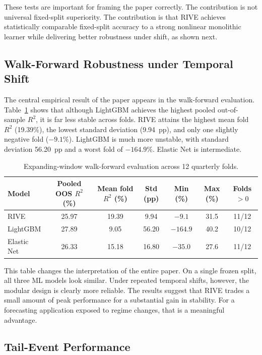 \documentclass[review]{elsarticle}
\begin{document}
These tests are important for framing the paper correctly. The contribution is not universal fixed-split superiority. The contribution is that RIVE achieves statistically comparable fixed-split accuracy to a strong nonlinear monolithic learner while delivering better robustness under shift, as shown next.

\subsection{Walk-Forward Robustness under Temporal Shift}\label{sec:walk-forward}

The central empirical result of the paper appears in the walk-forward evaluation. Table~\ref{tab:walkforward} shows that although LightGBM achieves the highest pooled out-of-sample $R^2$, it is far less stable across folds. RIVE attains the highest mean fold $R^2$ (19.39\%), the lowest standard deviation (9.94~pp), and only one slightly negative fold ($-9.1\%$). LightGBM is much more unstable, with standard deviation 56.20~pp and a worst fold of $-164.9\%$. Elastic Net is intermediate.

\begin{table}[H]
\centering
\caption{Expanding-window walk-forward evaluation across 12 quarterly folds.}
\label{tab:walkforward}
\small
\begin{tabular}{lcccccc}
\toprule
Model & Pooled OOS $R^2$ (\%) & Mean fold $R^2$ (\%) & Std (pp) & Min (\%) & Max (\%) & Folds $>0$ \\
\midrule
RIVE & 25.97 & 19.39 & 9.94 & $-9.1$ & 31.5 & 11/12 \\
LightGBM & 27.89 & 9.05 & 56.20 & $-164.9$ & 40.2 & 10/12 \\
Elastic Net & 26.33 & 15.18 & 16.80 & $-35.0$ & 27.6 & 11/12 \\
\bottomrule
\end{tabular}
\normalsize
\end{table}

This table changes the interpretation of the entire paper. On a single frozen split, all three ML models look similar. Under repeated temporal shifts, however, the modular design is clearly more reliable. The results suggest that RIVE trades a small amount of peak performance for a substantial gain in stability. For a forecasting application exposed to regime changes, that is a meaningful advantage.

\subsection{Tail-Event Performance}\label{sec:tail-events}
\end{document}
